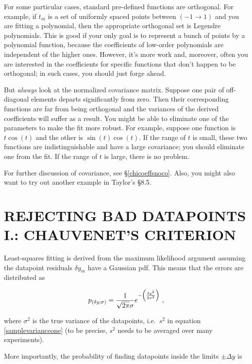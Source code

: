 \documentclass[psfig,preprint]{aastex}
\begin{document}
	For some particular cases, standard pre-defined functions are
orthogonal. For example, if $t_m$ is a set of uniformly spaced points
between $(-1 \rightarrow 1)$ and you are fitting a polynomial, then the
appropriate orthogonal set is Legendre polynomials. This is good if your
only goal is to represent a bunch of points by a polynomial function,
because the coefficients of low-order polynomials are independent of the
higher ones. However, it's more work and, moreover, often you are
interested in the coefficients for specific functions that don't happen
to be orthogonal; in such cases, you should just forge ahead. 

	But {\it always} look at the normalized covariance matrix.
Suppose one pair of off-diagonal elements departs significantly from
zero. Then their corresponding functions are far from being orthogonal
and the variances of the derived coefficients will suffer as a result.
You might be able to eliminate one of the parameters to make the fit
more robust. For example, suppose one function is $t \cos (t)$ and the
other is $\sin(t) \cos (t)$. If the range of $t$ is small, these two
functions are indistinguishable and have a large covariance; you should
eliminate one from the fit. If the range of $t$ is large, there is no
problem.

	For further discussion of covariance, see \S \ref {chicoeffsnoco}.
Also, you might also want to try out another example in Taylor's \S 8.5.

\section{REJECTING BAD DATAPOINTS I.: CHAUVENET'S CRITERION}
\label{chauvenetsection}

	Least-squares fitting is derived from the maximum likelihood
argument assuming the datapoint residuals $\delta y_m$ have a Gaussian
pdf. This means that the errors are distributed as 

\begin{equation}
p_{(\delta y; \sigma)} = {1 \over \sqrt{2\pi} \sigma} 
    e^{-\left( \delta y^2 \over 2 \sigma^2 \right)} \ ,
\end{equation}

\noindent where $\sigma^2$ is the true variance of the datapoints, i.e.\
$s^2$ in equation \ref{samplevarianceone} (to be precise, $s^2$ needs to
be averaged over many experiments). 

	More importantly, the probability of finding datapoints inside
the limits $\pm \Delta y$ is 
\end{document}
